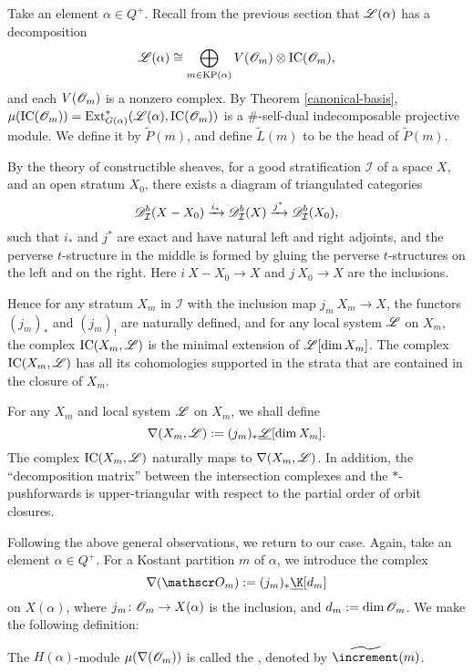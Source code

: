 Take an element $\alpha\in Q^+$.
Recall from the previous section that $\mathscr{L}(\alpha)$
has a decomposition $$\mathscr{L}(\alpha)\cong\bigoplus_{m\in\operatorname{KP}(\alpha)}
V(\mathscr{O}_m)\otimes\mathrm{IC}(\mathscr{O}_m),$$ and each $V(\mathscr{O}_m)$ is a nonzero complex.
By Theorem \ref{canonical-basis},
$\mu(\mathrm{IC}(\mathscr{O}_m)) = \operatorname{Ext}^*_{G(\alpha)}(\mathscr{L}(\alpha),
\mathrm{IC}(\mathscr{O}_m))$ is a $\#$-self-dual indecomposable projective module.
We define it by $\widetilde{P}(m)$, and define
$\widetilde{L}(m)$ to be the head of $\widetilde{P}(m)$.

By the theory of constructible sheaves, for a good stratification
$\mathcal{I}$ of a space $X$, and an open stratum $X_0$,
there exists a diagram of triangulated categories
\[
    \mathscr{D}^b_{\mathcal{I}}(X-X_0)\xrightarrow{i_*}\mathscr{D}^b_{\mathcal{I}}(X)\xrightarrow{j^*}\mathscr{D}^b_{\mathcal{I}}(X_0),
\]
such that $i_*$ and $j^*$ are exact and have natural left and right adjoints,
and the perverse $t$-structure in the middle is formed by gluing
the perverse $t$-structures on the left and on the right.
Here $i\:X-X_0\to X$ and $j\:X_0\to X$ are the inclusions.

Hence for any stratum $X_m$ in $\mathcal{I}$ with the inclusion map $j_m\:X_m\to X$, the functors
$(j_m)_*$ and $(j_m)_!$ are naturally defined, and for any 
local system $\mathscr{L}$ on $X_m$, the complex $\mathrm{IC}(X_m,\mathscr{L})$
is the minimal extension of $\mathscr{L}[\dim X_m]$. The complex $\mathrm{IC}(X_m,\mathscr{L})$
has all its cohomologies supported in the strata that are
contained in the closure of $X_m$.

For any $X_m$ and local system $\mathscr{L}$ on $X_m$, we shall define
\[
    \nabla(X_m,\mathscr{L}) := (j_m)_*\underline{\mathscr{L}}[\dim X_m].
\]
The complex $\mathrm{IC}(X_m,\mathscr{L})$ naturally maps to $\nabla(X_m,\mathscr{L})$.
In addition, the ``decomposition matrix'' between the
intersection complexes and the $*$-pushforwards
is upper-triangular with respect to the partial order of orbit closures.

Following the above general observations, we return to our case.
Again, take an element $\alpha\in Q^+$. For a Kostant partition $m$ of $\alpha$,
we introduce the complex $$\costd(\OO_m) := 
(j_m)_*\underline{\K}[d_m]$$ on $X(\alpha)$, where
$j_m\colon\mathscr{O}_m\to X(\alpha)$ is the inclusion, and $d_m := \dim \mathscr{O}_m$.
We make the following definition:

\begin{definition}
    The $H(\alpha)$-module $\mu(\nabla(\mathscr{O}_m))$ is called the
    , denoted by $\widetilde{\std}(m)$.
\end{definition}

